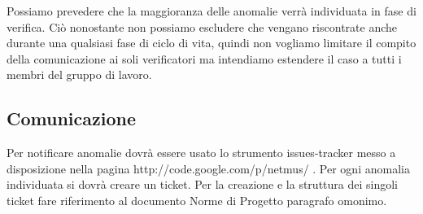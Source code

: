 Possiamo prevedere che la maggioranza delle anomalie verr\`a individuata in fase
di verifica. Ci\`o nonostante non possiamo escludere che vengano riscontrate
anche durante una qualsiasi fase di ciclo di vita, quindi non vogliamo limitare
il compito della comunicazione ai soli verificatori ma intendiamo estendere il
caso a tutti i membri del gruppo di lavoro.

\subsection{Comunicazione}

Per notificare anomalie dovr\`a essere usato lo strumento issues-tracker messo a
disposizione nella pagina http://code.google.com/p/netmus/ . Per ogni anomalia
individuata si dovr\`a creare un ticket. Per la creazione e la struttura dei
singoli ticket fare riferimento al documento Norme di Progetto paragrafo omonimo.


